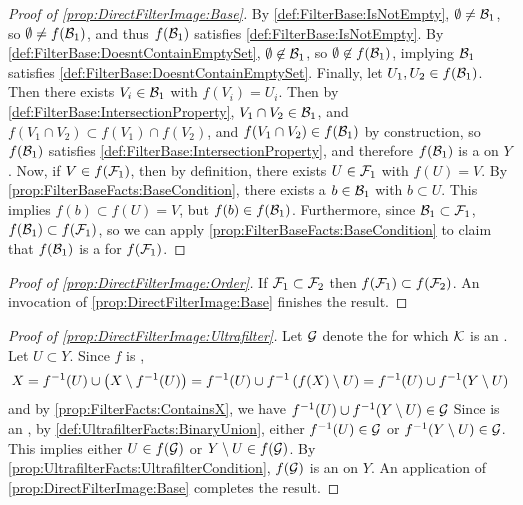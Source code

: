 \begin{prop}
\begin{proof}[Proof of \ref{prop:DirectFilterImage:Base}]
   By \ref{def:FilterBase:IsNotEmpty}, $\emptyset \neq \mathcal{B}_1$, 
   so $\emptyset \neq f(\mathcal{B}_1)$, and thus $f(\mathcal{B}_1)$ satisfies \ref{def:FilterBase:IsNotEmpty}. 
   By \ref{def:FilterBase:DoesntContainEmptySet}, $\emptyset \not \in \mathcal{B}_1$, so
   $\emptyset \not \in f(\mathcal{B}_1)$, implying $\mathcal{B}_1$ satisfies \ref{def:FilterBase:DoesntContainEmptySet}. 
   Finally, let $U_1,U_2 \in f(\mathcal{B}_1)$.
   Then there exists $V_i \in \mathcal{B}_1$ with $f(V_i) = U_i$. 
   Then by \ref{def:FilterBase:IntersectionProperty}, $V_1 \cap V_2 \in \mathcal{B}_1$, 
   and $f(V_1 \cap V_2) \subset f(V_1) \cap f(V_2)$, and $f(V_1 \cap V_2) \in f(\mathcal{B}_1)$
   by construction, so $f(\mathcal{B}_1)$ satisfies \ref{def:FilterBase:IntersectionProperty}, 
   and therefore $f(\mathcal{B}_1)$ is a \FilterBase on $Y$. 
   Now, if $V \in f(\mathcal{F}_1)$, then by definition, there exists 
   $U \in \mathcal{F}_1$ with $f(U) = V$. 
   By \ref{prop:FilterBaseFacts:BaseCondition}, there 
   exists a $b \in \mathcal{B}_1$ with $b \subset U$. This implies $f(b) \subset f(U)=V$, but 
   $f(b) \in f(\mathcal{B}_1)$.
   Furthermore, since $\mathcal{B}_1 \subset \mathcal{F}_1$, 
   $f(\mathcal{B}_1)\subset f(\mathcal{F}_1)$, so 
   we can apply \ref{prop:FilterBaseFacts:BaseCondition} to claim 
   that $f(\mathcal{B}_1)$ is a \FilterBase for $f(\mathcal{F}_1)$. 
\end{proof}
\begin{proof}[Proof of \ref{prop:DirectFilterImage:Order}]
    If $\mathcal{F}_1 \subset \mathcal{F}_2$ then $f(\mathcal{F}_1) \subset f(\mathcal{F}_2)$. 
    An invocation of \ref{prop:DirectFilterImage:Base} finishes the result. 
\end{proof}
\begin{proof}[Proof of \ref{prop:DirectFilterImage:Ultrafilter}]
   Let $\mathcal{G}$ denote the \Ultrafilter for which 
   $\mathcal{K}$ is an \UltrafilterBase.
   Let $U \subset Y$.
   Since $f$ is \Surjective, 
   \begin{equation}
   X= f^{-1}(U) \cup \left( X \setminus f^{-1}(U)\right) = f^{-1}(U) \cup f^{-1} \left( f(X) \setminus U\right)= f^{-1}(U) \cup f^{-1}(Y \setminus U)
   \end{equation}
   and by \ref{prop:FilterFacts:ContainsX}, we have 
    $f^{-1}(U) \cup f^{-1}(Y \setminus U) \in \mathcal{G}$
    Since \scG is an \Ultrafilter, by \ref{def:UltrafilterFacts:BinaryUnion}, 
    either $f^{-1}(U) \in \mathcal{G}$ or $f^{-1}(Y \setminus U) \in \mathcal{G}$. 
    This implies either 
    $U \in f( \mathcal{G})$ or $Y \setminus U \in f(\mathcal{G})$. 
    By \ref{prop:UltrafilterFacts:UltrafilterCondition}, 
    $f(\mathcal{G})$ is an \Ultrafilter on $Y$. 
    An application of \ref{prop:DirectFilterImage:Base} completes the result.
\end{proof}
\end{prop}
